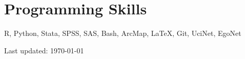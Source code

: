 \documentclass[11pt]{article} %
\begin{document}
\section*{Programming Skills}
R, Python, Stata, SPSS, SAS, Bash, ArcMap, \LaTeX, Git, UciNet, EgoNet



%





\vfill %


\begin{center}
\scriptsize
Last updated: \today~~\raisebox{-0.5pt}~~ \\
	

\end{center}
\end{document}
